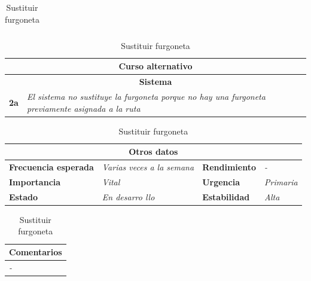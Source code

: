 \documentclass[12pt,spanish]{article}
\begin{document}
\begin{table}[H]
\begin{tabular}{|m{5pt}|m{7.33cm}|m{5pt}|m{7.33cm}|}
		
	\end{tabular}
	
	\vspace{0.5cm}
	
	\begin{tabular}{|m{12pt}|m{15.5cm}|}
		\hline
		\multicolumn{2}{|c|}{\textbf{Curso alternativo}} \\
		\hline
		\multicolumn{2}{|c|}{\textbf{Sistema}} \\
		\hline
		\textbf{2a} & \textit{El sistema no sustituye la furgoneta porque no hay una furgoneta previamente asignada a la ruta} \\
		\hline
	
		
	\end{tabular}
	
	\vspace{0.5cm}
	
	\begin{tabular}{|m{3.75cm}|m{3.75cm}|m{3.75cm}|m{3.8cm}|}
		\hline
		\multicolumn{4}{|c|}{\textbf{Otros datos}} \\
		\hline
		\textbf{Frecuencia esperada} & \textit{Varias veces a la semana} & \textbf{Rendimiento} & \textit{-} \\
		\hline
		\textbf{Importancia} & \textit{Vital} & \textbf{Urgencia} & \textit{Primaria} \\
		\hline
		\textbf{Estado} & \textit{En desarro
		llo} & \textbf{Estabilidad} & \textit{Alta} \\
		\hline
	\end{tabular}
	
	\vspace{1cm}
	
	\begin{tabular}{|m{16.2cm}|}
		\hline
		\textbf{Comentarios} \\
		\hline
		\textit{-} \\
		\hline
	\end{tabular}
	
	\caption{Sustituir furgoneta}
	
\end{table}
\end{document}
